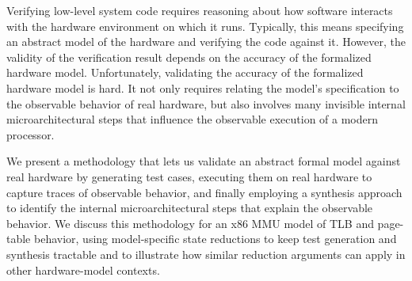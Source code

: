 %

Verifying low-level system code requires reasoning about how software interacts with the hardware environment on which it runs.
Typically, this means specifying an abstract model of the hardware and verifying the code against it. 
However, the validity of the verification result depends on the accuracy of the formalized hardware model.  
%
Unfortunately, validating the accuracy of the formalized hardware model is hard. It not only requires relating the model's specification to the observable behavior of real hardware, but also involves many invisible internal microarchitectural steps that influence the observable execution of a modern processor. 

We present a methodology that lets us validate an abstract formal model against real hardware by generating test cases, executing them on real hardware to capture traces of observable behavior, and finally employing a synthesis approach to identify the internal microarchitectural steps that explain the observable behavior.
We discuss this methodology for an x86 MMU model of TLB and page-table behavior, using model-specific state reductions to keep test generation and synthesis tractable and to illustrate how similar reduction arguments can apply in other hardware-model contexts. 